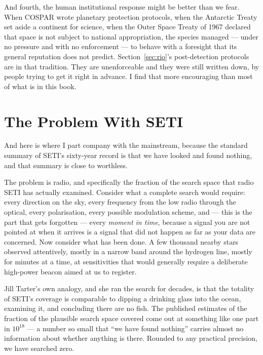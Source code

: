 And fourth, the human institutional response might be better than we fear. When COSPAR wrote
planetary protection protocols, when the Antarctic Treaty set aside a continent for science, when the
Outer Space Treaty of 1967 declared that space is not subject to national appropriation, the species
managed --- under no pressure and with no enforcement --- to behave with a foresight that its general
reputation does not predict. Section~\ref{sec:rio}'s post-detection protocols are in that tradition.
They are unenforceable and they were still written down, by people trying to get it right in advance.
I find that more encouraging than most of what is in this book.

\section{The Problem With SETI}\label{sec:setiproblem}

And here is where I part company with the mainstream, because the standard summary of SETI's
sixty-year record is that we have looked and found nothing, and that summary is close to worthless.

The problem is radio, and specifically the fraction of the search space that radio SETI has actually
examined. Consider what a complete search would require: every direction on the sky, every frequency
from the low radio through the optical, every polarisation, every possible modulation scheme, and ---
this is the part that gets forgotten --- every \emph{moment in time}, because a signal you are not
pointed at when it arrives is a signal that did not happen as far as your data are concerned. Now
consider what has been done. A few thousand nearby stars observed attentively, mostly in a narrow
band around the hydrogen line, mostly for minutes at a time, at sensitivities that would generally
require a deliberate high-power beacon aimed at us to register.

Jill Tarter's own analogy, and she ran the search for decades, is that the totality of SETI's
coverage is comparable to dipping a drinking glass into the ocean, examining it, and concluding there
are no fish. The published estimates of the fraction of the plausible search space covered come out
at something like one part in $10^{18}$ --- a number so small that ``we have found nothing'' carries
almost no information about whether anything is there. Rounded to any practical precision, we have
searched zero.

